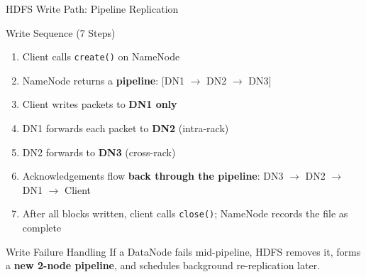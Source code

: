 \documentclass[aspectratio=169,10pt]{beamer}
\begin{document}
\begin{frame}{HDFS Write Path: Pipeline Replication}
 
      \begin{block}{Write Sequence (7 Steps)}
        \begin{enumerate}
          \item Client calls \texttt{create()} on NameNode
          \item NameNode returns a \textbf{pipeline}: [DN1 $\to$ DN2 $\to$ DN3]
          \item Client writes packets to \textbf{DN1 only}
          \item DN1 forwards each packet to \textbf{DN2} (intra-rack)
          \item DN2 forwards to \textbf{DN3} (cross-rack)
          \item Acknowledgements flow \textbf{back through the pipeline}: DN3 $\to$ DN2 $\to$ DN1 $\to$ Client
          \item After all blocks written, client calls \texttt{close()}; NameNode records the file as complete
        \end{enumerate}
      \end{block}
      \vspace{2pt}
      \begin{alertblock}{Write Failure Handling}
        If a DataNode fails mid-pipeline, HDFS removes it, forms a \textbf{new 2-node pipeline}, and schedules background re-replication later.
      \end{alertblock}

     
\end{frame}
\end{document}
